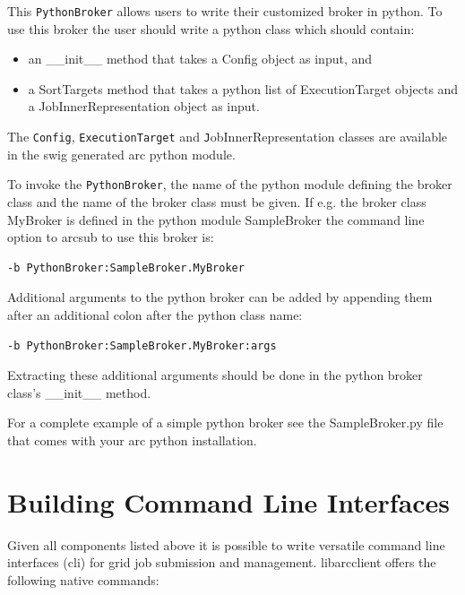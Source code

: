 \documentclass{book}
\newcommand{\libarcclient}{libarcclient}
\newcommand{\Config}{\texttt{Config}}
\newcommand{\PythonBroker}{\texttt{PythonBroker}}
\newcommand{\ExecutionTarget}{\texttt{ExecutionTarget}}
\begin{document}
This {\PythonBroker} allows users to write their customized broker in
python. To use this broker the user should write a python class which 
should contain:

\begin{itemize}

\item{an \_\_init\_\_ method that takes a Config object as input, and}
\item{a SortTargets method that takes a python list of ExecutionTarget
  objects and a JobInnerRepresentation object as input.}

\end{itemize}

The {\Config}, {\ExecutionTarget} and {\texttt JobInnerRepresentation} classes are
available in the swig generated arc python module.

To invoke the {\PythonBroker}, the name of the python module defining
the broker class and the name of the broker class must be given. If
e.g. the broker class MyBroker is defined in the python module
SampleBroker the command line option to arcsub to use this broker is:

\begin{shaded}
\begin{verbatim}
-b PythonBroker:SampleBroker.MyBroker
\end{verbatim}
\end{shaded}

Additional arguments to the python broker can be added by appending
them after an additional colon after the python class name:

\begin{shaded}
\begin{verbatim}
-b PythonBroker:SampleBroker.MyBroker:args
\end{verbatim}
\end{shaded}

Extracting these additional arguments should be done in the python
broker class's \_\_init\_\_ method.

For a complete example of a simple python broker see the
SampleBroker.py file that comes with your arc python installation.

\chapter{Building Command Line Interfaces}
\label{sec:cli}

Given all components listed above it is possible to write versatile
command line interfaces (cli) for grid job submission and
management. {\libarcclient} offers the following native commands:
\end{document}
